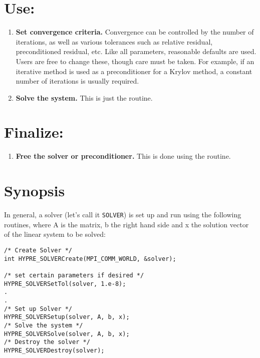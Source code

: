 \section*{Use:}

\begin{enumerate}

\item
{\bf Set convergence criteria.}  Convergence can be controlled by the
number of iterations, as well as various tolerances such as relative
residual, preconditioned residual, etc.  Like all parameters,
reasonable defaults are used.  Users are free to change these, though
care must be taken.  For example, if an iterative method is used as a
preconditioner for a Krylov method, a constant number of iterations is
usually required.

\item
{\bf Solve the system.}  This is just the  routine.

\end{enumerate}


\section*{Finalize:}

\begin{enumerate}

\item
{\bf Free the solver or preconditioner.} This is done using the
 routine.

\end{enumerate}


\section* {Synopsis}

In general, a solver (let's call it {\tt SOLVER}) is set up and run using the following routines,
where A is the matrix, b the right hand side and x the solution vector
of the linear system to be solved:

\begin{display}
\begin{verbatim}
/* Create Solver */
int HYPRE_SOLVERCreate(MPI_COMM_WORLD, &solver); 

/* set certain parameters if desired */
HYPRE_SOLVERSetTol(solver, 1.e-8);
.
.
/* Set up Solver */
HYPRE_SOLVERSetup(solver, A, b, x);
/* Solve the system */
HYPRE_SOLVERSolve(solver, A, b, x);
/* Destroy the solver */
HYPRE_SOLVERDestroy(solver);
\end{verbatim}
\end{display}

